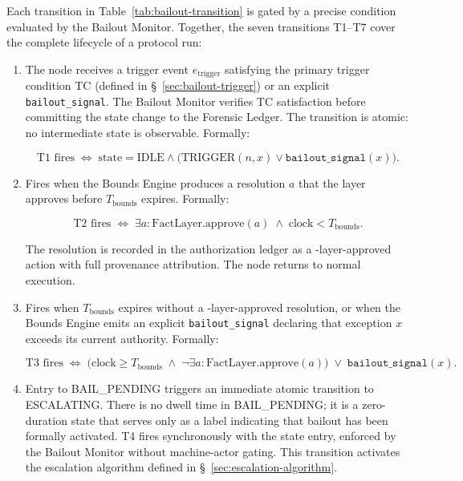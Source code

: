 Each transition in Table~\ref{tab:bailout-transition} is gated by a precise condition evaluated by the Bailout Monitor. Together, the seven transitions T1--T7 cover the complete lifecycle of a protocol run:

\begin{enumerate}\itemsep=0pt
\item[\textbf{T1 --- IDLE $\rightarrow$ BOUNDED (trigger):}] The node receives a trigger event $e_{\text{trigger}}$ satisfying the primary trigger condition TC (defined in \S~\ref{sec:bailout-trigger}) or an explicit \texttt{bailout\_signal}. The Bailout Monitor verifies TC satisfaction before committing the state change to the Forensic Ledger. The transition is atomic: no intermediate state is observable. Formally:

\begin{equation}
\text{T1 fires} \;\iff\; \text{state} = \text{IDLE} \land \bigl(\text{TRIGGER}(n, x) \lor \texttt{bailout\_signal}(x)\bigr). \tag{T1}
\end{equation}

\item[\textbf{T2 --- BOUNDED $\rightarrow$ IDLE (resolution):}] Fires when the Bounds Engine produces a resolution $a$ that the \fact{} layer approves before $T_{\text{bounds}}$ expires. Formally:

\begin{equation}
\text{T2 fires} \;\iff\; \exists a : \text{FactLayer.approve}(a) \;\land\; \text{clock} < T_{\text{bounds}}. \tag{T2}
\end{equation}

The resolution is recorded in the authorization ledger as a \fact-layer-approved action with full provenance attribution. The node returns to normal execution.

\item[\textbf{T3 --- BOUNDED $\rightarrow$ BAIL\_PENDING (escalation):}] Fires when $T_{\text{bounds}}$ expires without a \fact-layer-approved resolution, or when the Bounds Engine emits an explicit \texttt{bailout\_signal} declaring that exception $x$ exceeds its current authority. Formally:

\begin{equation}
\text{T3 fires} \;\iff\; \bigl(\text{clock} \geq T_{\text{bounds}} \;\land\; \neg\exists a : \text{FactLayer.approve}(a)\bigr) \;\lor\; \texttt{bailout\_signal}(x). \tag{T3}
\end{equation}

\item[\textbf{T4 --- BAIL\_PENDING $\rightarrow$ ESCALATING (activation):}] Entry to BAIL\_PENDING triggers an immediate atomic transition to ESCALATING. There is no dwell time in BAIL\_PENDING; it is a zero-duration state that serves only as a label indicating that bailout has been formally activated. T4 fires synchronously with the state entry, enforced by the Bailout Monitor without machine-actor gating. This transition activates the escalation algorithm defined in \S~\ref{sec:escalation-algorithm}.


\end{enumerate}
